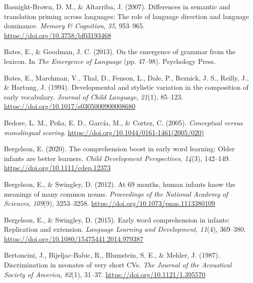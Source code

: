 \documentclass[
  12pt,
  b5paperpaper,
  twoside]{scrreprt}
\newlength{\cslhangindent}
\newlength{\cslentryspacingunit} %
\newenvironment{CSLReferences}[2] %
 {%
  \setlength{\parindent}{0pt}
  \ifodd #1
  \let\oldpar\par
  \def\par{\hangindent=\cslhangindent\oldpar}
  \fi
  \setlength{\parskip}{#2\cslentryspacingunit}
 }%
 {}
\begin{document}
\begin{CSLReferences}{1}{0}
\leavevmode{}%
Basnight-Brown, D. M., \& Altarriba, J. (2007). Differences in semantic
and translation priming across languages: The role of language direction
and language dominance. \emph{Memory \& Cognition}, \emph{35}, 953--965.
\url{https://doi.org/10.3758/bf03193468}

\leavevmode{}%
Bates, E., \& Goodman, J. C. (2013). On the emergence of grammar from
the lexicon. In \emph{The {Emergence} of {Language}} (pp. 47--98).
{Psychology Press}.

\leavevmode{}%
Bates, E., Marchman, V., Thal, D., Fenson, L., Dale, P., Reznick, J. S.,
Reilly, J., \& Hartung, J. (1994). Developmental and stylistic variation
in the composition of early vocabulary. \emph{Journal of Child
Language}, \emph{21}(1), 85--123.
\url{https://doi.org/10.1017/s0305000900008680}

\leavevmode{}%
Bedore, L. M., Peña, E. D., García, M., \& Cortez, C. (2005).
\emph{Conceptual versus monolingual scoring}.
\url{https://doi.org/10.1044/0161-1461(2005/020)}

\leavevmode{}%
Bergelson, E. (2020). The comprehension boost in early word learning:
Older infants are better learners. \emph{Child Development
Perspectives}, \emph{14}(3), 142--149.
\url{https://doi.org/10.1111/cdep.12373}

\leavevmode{}%
Bergelson, E., \& Swingley, D. (2012). At 6{\textendash}9 months, human
infants know the meanings of many common nouns. \emph{Proceedings of the
National Academy of Sciences}, \emph{109}(9), 3253--3258.
\url{https://doi.org/10.1073/pnas.1113380109}

\leavevmode{}%
Bergelson, E., \& Swingley, D. (2015). Early word comprehension in
infants: Replication and extension. \emph{Language Learning and
Development}, \emph{11}(4), 369--380.
\url{https://doi.org/10.1080/15475441.2014.979387}

\leavevmode{}%
Bertoncini, J., Bijeljac-Babic, R., Blumstein, S. E., \& Mehler, J.
(1987). Discrimination in neonates of very short {CVs}. \emph{The
Journal of the Acoustical Society of America}, \emph{82}(1), 31--37.
\url{https://doi.org/10.1121/1.395570}


\end{CSLReferences}
\end{document}
